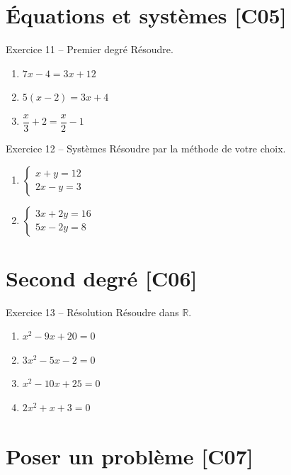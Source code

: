 \documentclass[a4paper,11pt]{article}
\begin{document}
\section{Équations et systèmes \hfill {\normalsize\color{uimmred}[C05]}}

\begin{exo}{Exercice 11 -- Premier degré}
Résoudre.
\begin{enumerate}[label=\alph*)]
  \item $7x - 4 = 3x + 12$
  \item $5(x - 2) = 3x + 4$
  \item $\dfrac{x}{3} + 2 = \dfrac{x}{2} - 1$
\end{enumerate}
\end{exo}

\begin{exo}{Exercice 12 -- Systèmes}
Résoudre par la méthode de votre choix.
\begin{enumerate}[label=\alph*)]
  \item $\begin{cases} x + y = 12 \\ 2x - y = 3 \end{cases}$
  \item $\begin{cases} 3x + 2y = 16 \\ 5x - 2y = 8 \end{cases}$
\end{enumerate}
\end{exo}

\section{Second degré \hfill {\normalsize\color{uimmred}[C06]}}

\begin{exo}{Exercice 13 -- Résolution}
Résoudre dans $\mathbb{R}$.
\begin{enumerate}[label=\alph*)]
  \item $x^2 - 9x + 20 = 0$
  \item $3x^2 - 5x - 2 = 0$
  \item $x^2 - 10x + 25 = 0$
  \item $2x^2 + x + 3 = 0$
\end{enumerate}
\end{exo}

\section{Poser un problème \hfill {\normalsize\color{uimmred}[C07]}}
\end{document}
